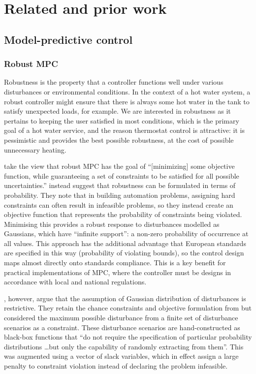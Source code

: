 \chapter{Related and prior work}
\label{ch:review}

\section{Model-predictive control}

\subsection{Robust MPC}

Robustness is the property that a controller functions well under various disturbances or environmental conditions.
In the context of a hot water system, a robust controller might ensure that there is always some hot water in the tank to satisfy unexpected loads, for example.
We are interested in robustness as it pertains to keeping the user satisfied in most conditions, which is the primary goal of a hot water service, and the reason thermostat control is attractive: it is pessimistic and provides the best possible robustness, at the cost of possible unnecessary heating.

\textcite{Jalali06} take the view that robust MPC has the goal of ``[minimizing] some objective function, while guaranteeing a set of constraints to be satisfied for all possible uncertainties.''
\textcite{Oldewurtel10} instead suggest that robustness can be formulated in terms of probability.
They note that in building automation problems, assigning hard constraints can often result in infeasible problems, so they instead create an objective function that represents the probability of constraints being violated.
Minimising this provides a robust response to disturbances modelled as Gaussians, which have ``infinite support'': a non-zero probability of occurrence at all values.
This approach has the additional advantage that European standards are specified in this way (probability of violating bounds), so the control design maps almost directly onto standards compliance.
This is a key benefit for practical implementations of MPC, where the controller must be designs in accordance with local and national regulations.

\textcite{Parisio14}, however, argue that the assumption of Gaussian distribution of disturbances is restrictive.
They retain the chance constraints and objective formulation from  but considered the maximum possible disturbance from a finite set of disturbance scenarios as a constraint.
These disturbance scenarios are hand-constructed as black-box functions that ``do not require the specification of particular probability distributions \dots but only the capability of randomly extracting from them''.
This was augmented using a vector of slack variables, which in effect assign a large penalty to constraint violation instead of declaring the problem infeasible.

